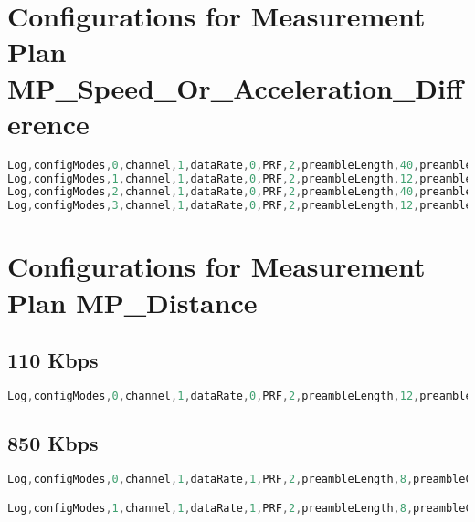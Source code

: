 \chapter{Configurations for Measurement Plan MP\_Speed\_Or\_Acceleration\_Difference}
\begin{lstlisting}[caption={Configurations for Measurement Plan MP\_Speed\_Or\_Acceleration\_Difference}, label={app:ConfigurationsforMeasurementPlanMPSpeedOrAcceleration}, language=C]
Log,configModes,0,channel,1,dataRate,0,PRF,2,preambleLength,40,preambleCodes,9,smartPower,0,nonStandardSFD,0
Log,configModes,1,channel,1,dataRate,0,PRF,2,preambleLength,12,preambleCodes,9,smartPower,0,nonStandardSFD,0
Log,configModes,2,channel,1,dataRate,0,PRF,2,preambleLength,40,preambleCodes,9,smartPower,0,nonStandardSFD,1
Log,configModes,3,channel,1,dataRate,0,PRF,2,preambleLength,12,preambleCodes,9,smartPower,0,nonStandardSFD,1
\end{lstlisting}

\chapter{Configurations for Measurement Plan MP\_Distance}
\section{110 Kbps}
\begin{lstlisting}[caption={Configurations for Measurement Plan MP\_Distance, 110 Kbps}, label={app:ConfigurationsforMeasurementPlanMPDistance110kbps}, language=C]
Log,configModes,0,channel,1,dataRate,0,PRF,2,preambleLength,12,preambleCodes,9,smartPower,0,nonStandardSFD,0
\end{lstlisting}
\section{850 Kbps}
\begin{lstlisting}[caption={Configurations for Measurement Plan MP\_Distance, 850 Kbps}, label={app:ConfigurationsforMeasurementPlanMPDistance850kbps}, language=C]
Log,configModes,0,channel,1,dataRate,1,PRF,2,preambleLength,8,preambleCodes,9,smartPower,0,nonStandardSFD,0

Log,configModes,1,channel,1,dataRate,1,PRF,2,preambleLength,8,preambleCodes,9,smartPower,0,nonStandardSFD,1
\end{lstlisting}

